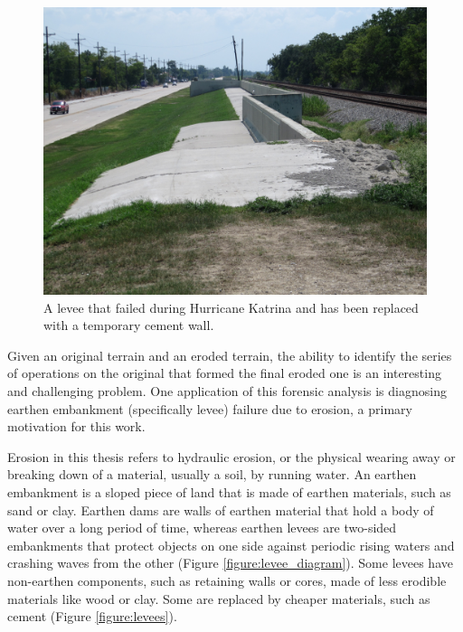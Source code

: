 \begin{figure}[t]
  \centering
  \begin{minipage}{0.99\textwidth}
    \includegraphics[width=1.0\textwidth]{images/RebuiltLevee.jpg}
  \end{minipage}
  \caption[A replacement cement wall]{A levee that failed during Hurricane Katrina and has been replaced with a temporary cement wall.}
  \label{figure:rebuilt_levee}
\end{figure}



% 
Given an original terrain and an eroded terrain, the ability to identify the series of operations on the original that formed the final eroded one is an interesting and challenging problem. One application of this forensic analysis is diagnosing earthen embankment (specifically levee) failure due to erosion, a primary motivation for this work.

Erosion in this thesis refers to hydraulic erosion, or the physical wearing away or breaking down of a material, usually a soil, by running water. 
An earthen embankment is a sloped piece of land that is made 
of earthen materials, such as sand or clay. Earthen dams are walls of earthen material that hold a body of water over a long period of time, whereas earthen levees are two-sided embankments that protect objects on one side against periodic rising waters and crashing waves from the other (Figure \ref{figure:levee_diagram}). Some levees have non-earthen components, such as retaining walls or cores, made of less erodible materials like wood or clay. Some are replaced by cheaper materials, such as cement (Figure \ref{figure:levees}).

